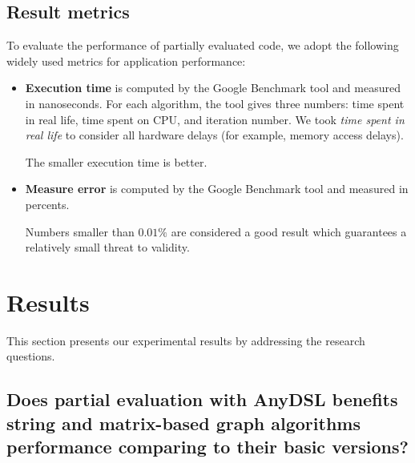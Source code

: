 \documentclass[conference]{IEEEtran}
\begin{document}
\subsection{Result metrics}
To evaluate the performance of partially evaluated code, we adopt the following widely used metrics for application performance:
\begin{itemize}
	\item \textbf{Execution time} is computed by the Google Benchmark tool and measured in nanoseconds. For each algorithm, the tool gives three numbers: time spent in real life, time spent on CPU, and iteration number. We took \textit{time spent in real life} to consider all hardware delays (for example, memory access delays).
	
	The smaller execution time is better.
	
	\item \textbf{Measure error} is computed by the Google Benchmark tool and measured in percents. 
	
	Numbers smaller than $0.01\%$ are considered a good result which guarantees a relatively small threat to validity.

\end{itemize}

\section{Results}
This section presents our experimental results by addressing the research questions.

\subsection{Does partial evaluation with AnyDSL benefits string and matrix-based graph algorithms performance comparing to their basic versions?}
\end{document}
